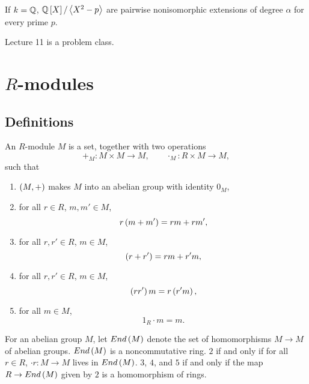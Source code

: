 If $ k = \mathbb{Q} $, $ \mathbb{Q}\left[ X \right] / \left\langle X^2 - p \right\rangle $ are pairwise nonisomorphic extensions of degree $ \alpha $ for every prime $ p $.


Lecture 11 is a problem class.

\pagebreak

\section{$ R $-modules}


\subsection{Definitions}

\begin{definition}
An $ R $-module $ M $ is a set, together with two operations
$$ +_M : M \times M \to M, \qquad \cdot_M : R \times M \to M, $$
such that
\begin{enumerate}
\item $ \left( M, + \right) $ makes $ M $ into an abelian group with identity $ 0_M $,
\item for all $ r \in R $, $ m, m' \in M $,
$$ r\left( m + m' \right) = rm + rm', $$
\item for all $ r, r' \in R $, $ m \in M $,
$$ \left( r + r' \right) = rm + r'm, $$
\item for all $ r, r' \in R $, $ m \in M $,
$$ \left( rr' \right)m = r\left( r'm \right), $$
\item for all $ m \in M $,
$$ 1_R \cdot m = m. $$
\end{enumerate}
\end{definition}

\begin{note*}
For an abelian group $ M $, let $ End\left( M \right) $ denote the set of homomorphisms $ M \to M $ of abelian groups. $ End\left( M \right) $ is a noncommutative ring. $ 2 $ if and only if for all $ r \in R $, $ \cdot r : M \to M $ lives in $ End\left( M \right) $. $ 3 $, $ 4 $, and $ 5 $ if and only if the map $ R \to End\left( M \right) $ given by $ 2 $ is a homomorphism of rings.
\end{note*}

